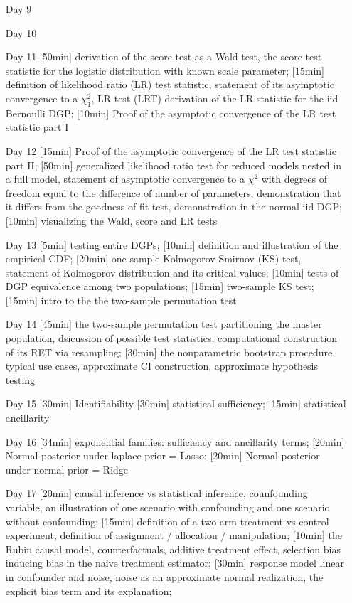 \begin{enumerate}
\item[Day 9] 
\item[Day 10] 

\item[Day 11] [50min] derivation of the score test as a Wald test, the score test statistic for the logistic distribution with known scale parameter; [15min] definition of likelihood ratio (LR) test statistic, statement of its asymptotic convergence to a $\chi^2_1$, LR test (LRT) derivation of the LR statistic for the iid Bernoulli DGP; [10min] Proof of the asymptotic convergence of the LR test statistic part I

\item[Day 12] [15min] Proof of the asymptotic convergence of the LR test statistic part II;  [50min] generalized likelihood ratio test for reduced models nested in a full model, statement of asymptotic convergence to a $\chi^2$ with degrees of freedom equal to the difference of number of parameters, demonstration that it differs from the goodness of fit test, demonstration in the normal iid DGP; [10min] visualizing the Wald, score and LR tests

\item[Day 13] [5min] testing entire DGPs; [10min] definition and illustration of the empirical CDF; [20min] one-sample Kolmogorov-Smirnov (KS) test, statement of Kolmogorov distribution and its critical values; [10min] tests of DGP equivalence among two populations; [15min] two-sample KS test; [15min] intro to the the two-sample permutation test



\item[Day 14] [45min] the two-sample permutation test partitioning the master population, dsicussion of possible test statistics, computational construction of its RET via resampling; [30min] the nonparametric bootstrap procedure, typical use cases, approximate CI construction, approximate hypothesis testing

\item[Day 15] [30min] Identifiability [30min] statistical sufficiency; [15min] statistical ancillarity

\item[Day 16] [34min] exponential families: sufficiency and ancillarity terms; [20min] Normal posterior under laplace prior = Lasso; [20min] Normal posterior under normal prior = Ridge

\item[Day 17] [20min] causal inference vs statistical inference, counfounding variable, an illustration of one scenario with confounding and one scenario without confounding; [15min] definition of a two-arm treatment vs control experiment, definition of assignment / allocation / manipulation; [10min] the Rubin causal model, counterfactuals, additive treatment effect, selection bias inducing bias in the naive treatment estimator; [30min] response model linear in confounder and noise, noise as an approximate normal realization, the explicit bias term and its explanation;


\end{enumerate}
